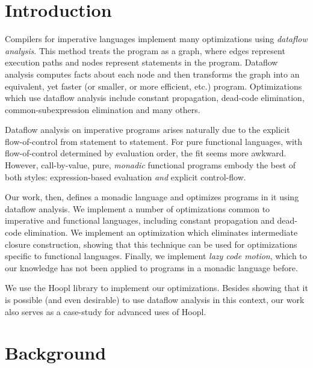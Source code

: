 \documentclass[12pt]{report}
\begin{document}
\VerbatimFootnotes
\DefineShortVerb{\#}
\doublespacing
             


\chapter{Introduction}

Compilers for imperative languages implement many optimizations using
\emph{dataflow analysis}. This method treats the program as a graph,
where edges represent execution paths and nodes represent statements
in the program. Dataflow analysis computes facts about each node and
then transforms the graph into an equivalent, yet faster (or smaller,
or more efficient, etc.) program. Optimizations which use dataflow
analysis include constant propagation, dead-code elimination,
common-subexpression elimination and many others.

Dataflow analysis on imperative programs arises naturally due to the
explicit flow-of-control from statement to statement. For pure
functional languages, with flow-of-control determined by evaluation
order, the fit seems more awkward. However, call-by-value, pure,
\emph{monadic} functional programs embody the best of both
styles: expression-based evaluation \emph{and} explicit
control-flow. 

Our work, then, defines a monadic language and optimizes programs in
it using dataflow analysis. We implement a number of optimizations
common to imperative and functional languages, including constant
propagation and dead-code elimination. We implement an optimization
which eliminates intermediate closure construction, showing that this
technique can be used for optimizations specific to functional
languages. Finally, we implement \emph{lazy code motion}, which to our
knowledge has not been applied to programs in a monadic language
before.

We use the Hoopl library to implement our
optimizations. Besides showing that it is possible (and even
desirable) to use dataflow analysis in this context, our work also
serves as a case-study for advanced uses of Hoopl.

\chapter{Background}

\end{document}
